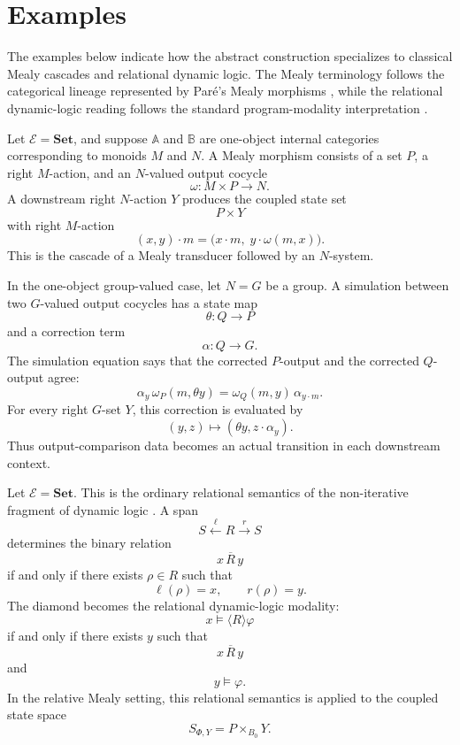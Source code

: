 \section{Examples}
\label{sec:relative-examples}

The examples below indicate how the abstract construction specializes to
classical Mealy cascades and relational dynamic logic. The Mealy terminology
follows the categorical lineage represented by Paré's Mealy morphisms
\cite{PareMealyMorphisms}, while the relational dynamic-logic reading follows
the standard program-modality interpretation
\cite{HarelKozenTiurynDynamicLogic}.

\begin{example}
\label{ex:relative-classical-mealy-cascade}
Let \(\mathcal E=\mathbf{Set}\), and suppose \(\mathbb A\) and \(\mathbb B\)
are one-object internal categories corresponding to monoids \(M\) and \(N\).
A Mealy morphism consists of a set \(P\), a right \(M\)-action, and an
\(N\)-valued output cocycle
\[
\omega:M\times P\to N.
\]
A downstream right \(N\)-action \(Y\) produces the coupled state set
\[
P\times Y
\]
with right \(M\)-action
\[
(x,y)\cdot m
=
\bigl(x\cdot m,\;y\cdot\omega(m,x)\bigr).
\]
This is the cascade of a Mealy transducer followed by an \(N\)-system.
\end{example}

\begin{example}
\label{ex:relative-simulation-output-correction}
In the one-object group-valued case, let \(N=G\) be a group. A simulation
between two \(G\)-valued output cocycles has a state map
\[
\theta:Q\to P
\]
and a correction term
\[
\alpha:Q\to G.
\]
The simulation equation says that the corrected \(P\)-output and the corrected
\(Q\)-output agree:
\[
\alpha_y\,\omega_P(m,\theta y)
=
\omega_Q(m,y)\,\alpha_{y\cdot m}.
\]
For every right \(G\)-set \(Y\), this correction is evaluated by
\[
(y,z)\longmapsto(\theta y,z\cdot\alpha_y).
\]
Thus output-comparison data becomes an actual transition in each downstream
context.
\end{example}

\begin{example}
\label{ex:relative-relational-pdl}
Let \(\mathcal E=\mathbf{Set}\). This is the ordinary relational semantics of
the non-iterative fragment of dynamic logic
\cite{HarelKozenTiurynDynamicLogic}. A span
\[
S\xleftarrow{\ell}R\xrightarrow{r}S
\]
determines the binary relation
\[
x\,\overline R\,y
\]
if and only if there exists \(\rho\in R\) such that
\[
\ell(\rho)=x,
\qquad
r(\rho)=y.
\]
The diamond becomes the relational dynamic-logic modality:
\[
x\models\langle R\rangle\varphi
\]
if and only if there exists \(y\) such that
\[
x\,\overline R\,y
\]
and
\[
y\models\varphi.
\]
In the relative Mealy setting, this relational semantics is applied to the
coupled state space
\[
S_{\Phi,Y}=P\times_{B_0}Y.
\]
\end{example}

